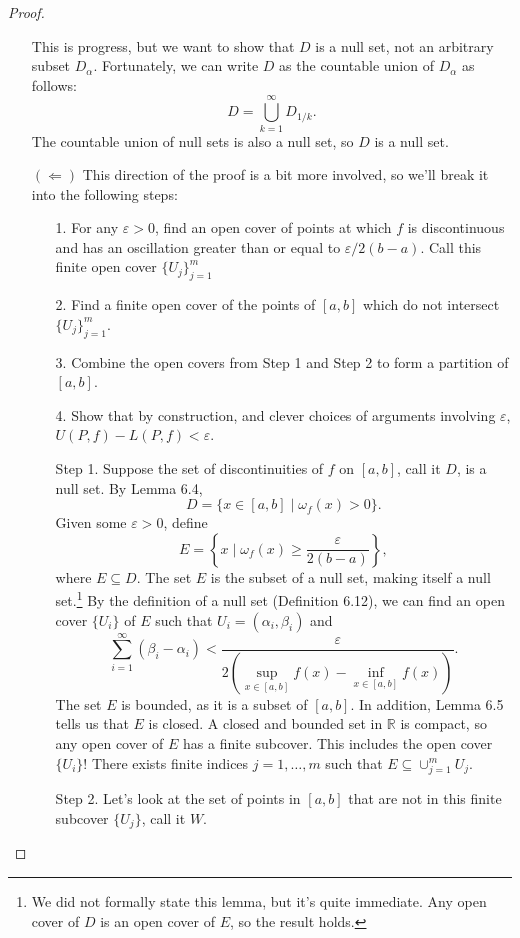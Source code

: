 \documentclass{article}
\newcommand{\R}{\mathbb{R}}
\newcommand{\brc}[1]{ \left\{#1\right\} }
\theoremstyle{definition}
\begin{document}
\begin{proof}
\begin{enumerate}
			This is progress, but we want to show that $ D $ is a null set, not an arbitrary subset $ D_\alpha $. Fortunately, we can write $ D $ as the countable union of $ D_\alpha $ as follows: 
			$$ D = \bigcup_{k=1}^\infty D_{1/k}.$$ The countable union of null sets is also a null set, so $ D $ is a null set. 
			\item [$ (\Longleftarrow) $] 
			This direction of the proof is a bit more involved, so we'll break it into the following steps:
			\begin{enumerate}
				\item[1.]  For any $ \varepsilon > 0 $, find an open cover of points at which $ f $ is discontinuous and has an oscillation greater than or equal to $ \varepsilon/2(b-a) $. Call this finite open cover $ \{U_j\}_{j=1}^m $
				\item[2.] Find a finite open cover of the points of $ [a,b] $ which do not intersect $ \{U_j\}_{j=1}^m $. 
				\item [3.] Combine the open covers from Step 1 and Step 2 to form a partition of $ [a,b] $.
				\item [4.] Show that by construction, and clever choices of arguments involving $ \varepsilon $, $ U(P,f) - L(P,f) < \varepsilon$.
			\end{enumerate}
			\begin{enumerate}
				\item [Step 1.]	Suppose the set of discontinuities of $ f $ on $ [a,b] $, call it $ D $, is a null set. By Lemma 6.4,
				$$ D=\{x\in[a,b] \mid \omega_f(x)>0\}. $$ Given some $ \varepsilon > 0 $, define $$ E=\brc{x\mid\omega_f(x)\ge \frac{\varepsilon}{2(b-a)}},$$ where $ E\subseteq D $. The set $ E $ is the subset of a null set, making itself a null set.\footnote{We did not formally state this lemma, but it's quite immediate. Any open cover of $ D $ is an open cover of $ E $, so the result holds.}  By the definition of a null set (Definition 6.12), we can find an open cover $ \{U_i\} $ of $ E $ such that $ U_i = (\alpha_i,\beta_i)$ and
				$$ \sum_{i=1}^\infty(\beta_i-\alpha_i)< \frac{\varepsilon}{2\left(\displaystyle\sup_{x\in[a,b]}f(x) - \displaystyle\inf_{x\in[a,b]}f(x) \right) }.$$ The set $ E $ is bounded, as it is a subset of $ [a,b] $. In addition, Lemma 6.5 tells us that $ E $ is closed. A closed and bounded set in $ \R $ is compact, so any open cover of $ E $ has a finite subcover. This includes the open cover $ \{U_i\} $! There exists finite indices $ j = 1,\ldots, m $ such that $ E \subseteq \cup_{j=1}^m U_j$. 
				\item[Step 2.] Let's look at the set of points in $ [a,b] $ that are not in this finite subcover $ \{U_j\} $, call it $ W $. 

\end{enumerate}
\end{enumerate}
\end{proof}
\end{document}

